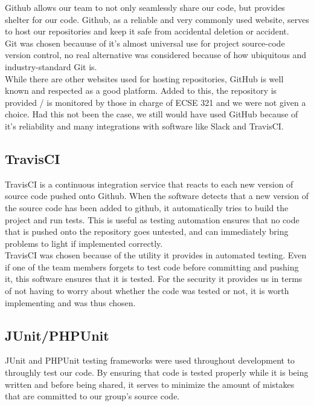 \documentclass[12pt]{report}
\begin{document}
Github allows our team to not only seamlessly share our code, but provides shelter for our code. Github, as a reliable  and very commonly used website, serves to host our repositories and keep it safe from accidental deletion or accident.\\

Git was chosen becauuse of it's almost universal use for project source-code version control, no real alternative was considered because of how ubiquitous and industry-standard Git is.\\

While there are other websites used for hosting repositories, GitHub is well known and respected as a good platform. Added to this, the repository is provided / is monitored by those in charge of ECSE 321 and we were not given a choice. Had this not been the case, we still would have used GitHub because of it's reliability and many integrations with software like Slack and TravisCI.

\subsection{TravisCI}
TravisCI is a continuous integration service that reacts to each new version of source code pushed onto Github. When the software detects that a new version of the source code has been added to github, it automatically tries to build the project and run tests. This is useful as testing automation ensures that no code that is pushed onto the repository goes untested, and can immediately bring problems to light if implemented correctly.\\

TravisCI was chosen because of the utility it provides in automated testing. Even if one of the team members forgets to test code before committing and pushing it, this software ensures that it is tested. For the security it provides us in terms of not having to worry about whether the code was tested or not, it is worth implementing and was thus chosen.

\subsection{JUnit/PHPUnit}
JUnit and PHPUnit testing frameworks were used throughout development to throughly test our code. By ensuring that code is tested properly while it is being written and before being shared, it serves to minimize the amount of mistakes that are committed to our group's source code.\\
\end{document}

